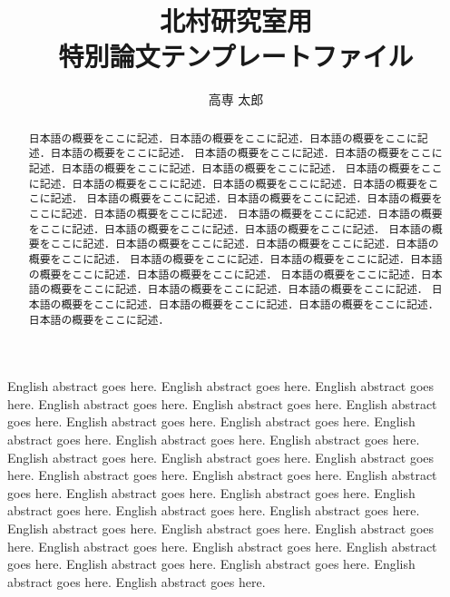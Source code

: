 \documentclass[senkouka]{nitkcthesis}%
\title{北村研究室用\\特別論文テンプレートファイル}
\author{高専 太郎}
\begin{document}

\maketitle%

\frontmatter


\begin{eabstract}
English abstract goes here. English abstract goes here. English abstract goes here. English abstract goes here. 
English abstract goes here. English abstract goes here. English abstract goes here. English abstract goes here. 
English abstract goes here. English abstract goes here. English abstract goes here. English abstract goes here. 
English abstract goes here. English abstract goes here. English abstract goes here. English abstract goes here. 
English abstract goes here. English abstract goes here. English abstract goes here. English abstract goes here. 
English abstract goes here. English abstract goes here. English abstract goes here. English abstract goes here. 
English abstract goes here. English abstract goes here. English abstract goes here. English abstract goes here. 
English abstract goes here. English abstract goes here. English abstract goes here. English abstract goes here.  
\end{eabstract}

\begin{abstract}
日本語の概要をここに記述．日本語の概要をここに記述．日本語の概要をここに記述．日本語の概要をここに記述．
日本語の概要をここに記述．日本語の概要をここに記述．日本語の概要をここに記述．日本語の概要をここに記述．
日本語の概要をここに記述．日本語の概要をここに記述．日本語の概要をここに記述．日本語の概要をここに記述．
日本語の概要をここに記述．日本語の概要をここに記述．日本語の概要をここに記述．日本語の概要をここに記述．
日本語の概要をここに記述．日本語の概要をここに記述．日本語の概要をここに記述．日本語の概要をここに記述．
日本語の概要をここに記述．日本語の概要をここに記述．日本語の概要をここに記述．日本語の概要をここに記述．
日本語の概要をここに記述．日本語の概要をここに記述．日本語の概要をここに記述．日本語の概要をここに記述．
日本語の概要をここに記述．日本語の概要をここに記述．日本語の概要をここに記述．日本語の概要をここに記述．
日本語の概要をここに記述．日本語の概要をここに記述．日本語の概要をここに記述．日本語の概要をここに記述．
\end{abstract}
\end{document}
